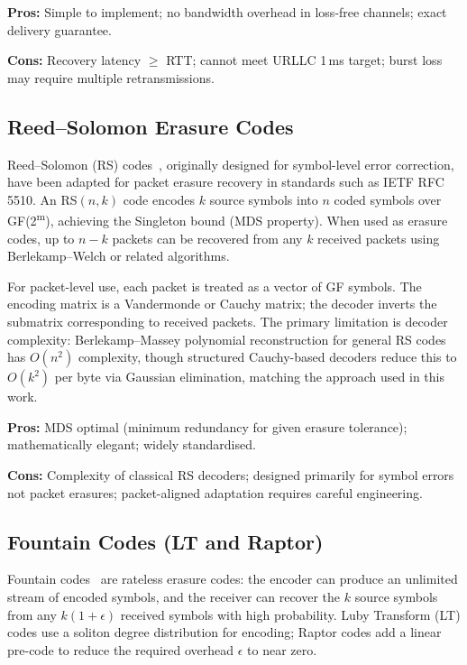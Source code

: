 \documentclass[conference]{IEEEtran}
\begin{document}
\noindent\textbf{Pros:} Simple to implement; no bandwidth overhead in
loss-free channels; exact delivery guarantee.\par
\textbf{Cons:} Recovery latency $\geq$ RTT; cannot meet URLLC 1\,ms
target; burst loss may require multiple retransmissions.

\subsection{Reed--Solomon Erasure Codes}

Reed--Solomon (RS) codes~\cite{reedsolomon1960}, originally designed for
symbol-level error correction, have been adapted for packet erasure
recovery in standards such as IETF RFC 5510. An RS$(n,k)$ code encodes
$k$ source symbols into $n$ coded symbols over GF(2\textsuperscript{m}),
achieving the Singleton bound (MDS property). When used as erasure codes,
up to $n{-}k$ packets can be recovered from any $k$ received packets
using Berlekamp--Welch or related algorithms.

For packet-level use, each packet is treated as a vector of GF symbols.
The encoding matrix is a Vandermonde or Cauchy matrix; the decoder
inverts the submatrix corresponding to received packets. The primary
limitation is decoder complexity: Berlekamp--Massey polynomial
reconstruction for general RS codes has $O(n^2)$ complexity, though
structured Cauchy-based decoders reduce this to $O(k^2)$ per byte
via Gaussian elimination, matching the approach used in this work.

\noindent\textbf{Pros:} MDS optimal (minimum redundancy for given
erasure tolerance); mathematically elegant; widely standardised.\par
\textbf{Cons:} Complexity of classical RS decoders; designed primarily
for symbol errors not packet erasures; packet-aligned adaptation
requires careful engineering.

\subsection{Fountain Codes (LT and Raptor)}

Fountain codes~\cite{shokrollahi2006raptor} are rateless erasure codes:
the encoder can produce an unlimited stream of encoded symbols, and the
receiver can recover the $k$ source symbols from any $k(1+\epsilon)$
received symbols with high probability. Luby Transform (LT) codes use a
soliton degree distribution for encoding; Raptor codes add a linear
pre-code to reduce the required overhead $\epsilon$ to near zero.
\end{document}
